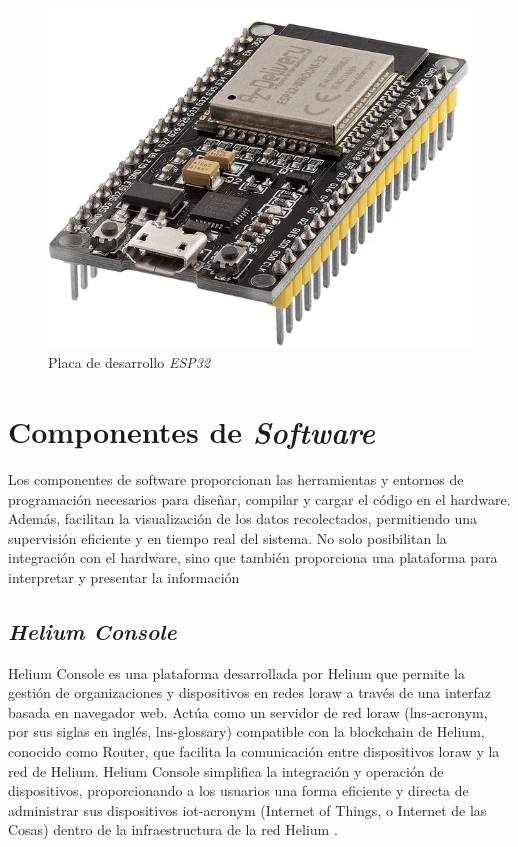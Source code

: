 \begin{figure}[H]
\leavevmode
\begin{minipage}{\textwidth}
\begin{center}
\includegraphics[scale=0.3]{./capitulo_03/figures/HW/wroomp.png}
\caption{Placa de desarrollo \textit{ESP32} \label{fig:wrom32}}
\end{center}
\end{minipage}
\end{figure}


\section{Componentes de \textit{Software}}
Los componentes de software proporcionan las herramientas y entornos de programación necesarios para diseñar, compilar y cargar el código en el hardware. Además, facilitan la visualización de los datos recolectados, permitiendo una supervisión eficiente y en tiempo real del sistema. No solo posibilitan la integración con el hardware, sino que también proporciona una plataforma para interpretar y presentar la información
\subsection{\textit{Helium Console}}
Helium Console es una plataforma desarrollada por Helium que permite la gestión de organizaciones y dispositivos en redes \acrshort{loraw}  a través de una interfaz basada en navegador web. Actúa como un servidor de red \acrshort{loraw} (\acrshort{lns-acronym}, por sus siglas en inglés, \gls{lns-glossary}) compatible con la blockchain de Helium, conocido como Router, que facilita la comunicación entre dispositivos \acrshort{loraw} y la red de Helium. Helium Console simplifica la integración y operación de dispositivos, proporcionando a los usuarios una forma eficiente y directa de administrar sus dispositivos \acrshort{iot-acronym} (Internet of Things, o Internet de las Cosas) dentro de la infraestructura de la red Helium \cite{heliumDocs}.

